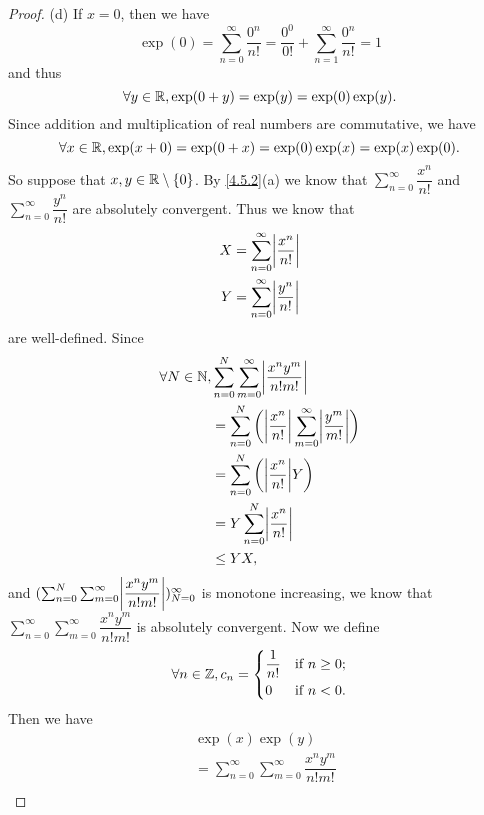 \begin{proof}{(d)}
  If \(x = 0\), then we have
  \[
    \exp(0) = \sum_{n = 0}^\infty \dfrac{0^n}{n!} = \dfrac{0^0}{0!} + \sum_{n = 1}^\infty \dfrac{0^n}{n!} = 1
  \]
  and thus
  \[
    \forall y \in \mathbb{R}, \exp(0 + y) = \exp(y) = \exp(0) \exp(y).
  \]
  Since addition and multiplication of real numbers are commutative, we have
  \[
    \forall x \in \mathbb{R}, \exp(x + 0) = \exp(0 + x) = \exp(0) \exp(x) = \exp(x) \exp(0).
  \]
  So suppose that \(x, y \in \mathbb{R} \setminus \left\lbrace0\right\rbrace\).
  By \cref{4.5.2}(a) we know that \(\sum_{n = 0}^\infty \dfrac{x^n}{n!}\) and \(\sum_{n = 0}^\infty \dfrac{y^n}{n!}\) are absolutely convergent.
  Thus we know that
  \begin{align*}
    X & = \sum_{n = 0}^\infty \abs{\dfrac{x^n}{n!}} \\
    Y & = \sum_{n = 0}^\infty \abs{\dfrac{y^n}{n!}}
  \end{align*}
  are well-defined.
  Since
  \begin{align*}
    \forall N \in \N, & \sum_{n = 0}^N \sum_{m = 0}^\infty \abs{\dfrac{x^n y^m}{n! m!}}                              \\
                      & = \sum_{n = 0}^N \bigg(\abs{\dfrac{x^n}{n!}} \sum_{m = 0}^\infty \abs{\dfrac{y^m}{m!}}\bigg) \\
                      & = \sum_{n = 0}^N \bigg(\abs{\dfrac{x^n}{n!}} Y\bigg)                                         \\
                      & = Y \sum_{n = 0}^N \abs{\dfrac{x^n}{n!}}                                                     \\
                      & \leq Y X,
  \end{align*}
  and \((\sum_{n = 0}^N \sum_{m = 0}^\infty \abs{\dfrac{x^n y^m}{n! m!}})_{N = 0}^\infty\) is monotone increasing, we know that \(\sum_{n = 0}^\infty \sum_{m = 0}^\infty \dfrac{x^n y^m}{n! m!}\) is absolutely convergent.
  Now we define
  \[
    \forall n \in \mathbb{Z}, c_n = \begin{dcases}
      \dfrac{1}{n!} & \text{if } n \geq 0; \\
      0             & \text{if } n < 0.
    \end{dcases}
  \]
  Then we have
  \begin{align*}
     & \exp(x) \exp(y)                                                                                                                                                           \\
     & = \sum_{n = 0}^\infty \sum_{m = 0}^\infty \dfrac{x^n y^m}{n! m!}                                                                                                          \\

\end{align*}
\end{proof}
